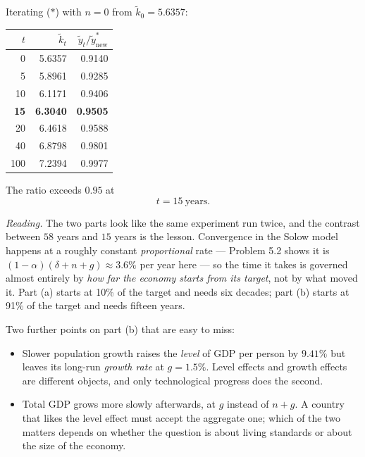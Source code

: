 \documentclass[12pt, letterpaper]{article}
\newcommand{\stst}{^{\ast}}
\begin{document}
\begin{tcolorbox}[oddbox,title={Problem 5.1 \quad Quantifying the Solow Model}]
\begin{enumerate}
\smallskip
Iterating ($\ast$) with $n=0$ from $\tilde k_0=5.6357$:
\begin{center}
\begin{tabular}{@{}rrr@{}}
\toprule
$t$ & $\tilde k_t$ & $\tilde y_t/\tilde y\stst_{\text{new}}$ \\
\midrule
0   & 5.6357 & 0.9140 \\
5   & 5.8961 & 0.9285 \\
10  & 6.1171 & 0.9406 \\
\textbf{15}  & \textbf{6.3040} & \textbf{0.9505} \\
20  & 6.4618 & 0.9588 \\
40  & 6.8798 & 0.9801 \\
100 & 7.2394 & 0.9977 \\
\bottomrule
\end{tabular}
\end{center}
The ratio exceeds $0.95$ at
\[
\boxed{t=15\ \text{years}} .
\]
\checkmark

\end{enumerate}

\smallskip
\emph{Reading.} The two parts look like the same experiment run twice, and the contrast
between $58$ years and $15$ years is the lesson. Convergence in the Solow model happens at a
roughly constant \emph{proportional} rate --- Problem 5.2 shows it is
$(1-\alpha)(\delta+n+g)\approx 3.6\%$ per year here --- so the time it takes is governed
almost entirely by \emph{how far the economy starts from its target}, not by what moved it.
Part (a) starts at 10\% of the target and needs six decades; part (b) starts at 91\% of the
target and needs fifteen years.

\smallskip
Two further points on part (b) that are easy to miss:
\begin{itemize}[leftmargin=1.3em,itemsep=2pt,topsep=3pt]
\item Slower population growth raises the \emph{level} of GDP per person by $9.41\%$ but
      leaves its long-run \emph{growth rate} at $g=1.5\%$. Level effects and growth effects
      are different objects, and only technological progress does the second.
\item Total GDP grows more slowly afterwards, at $g$ instead of $n+g$. A country that likes
      the level effect must accept the aggregate one; which of the two matters depends on
      whether the question is about living standards or about the size of the economy.
\end{itemize}


\end{tcolorbox}
\end{document}
